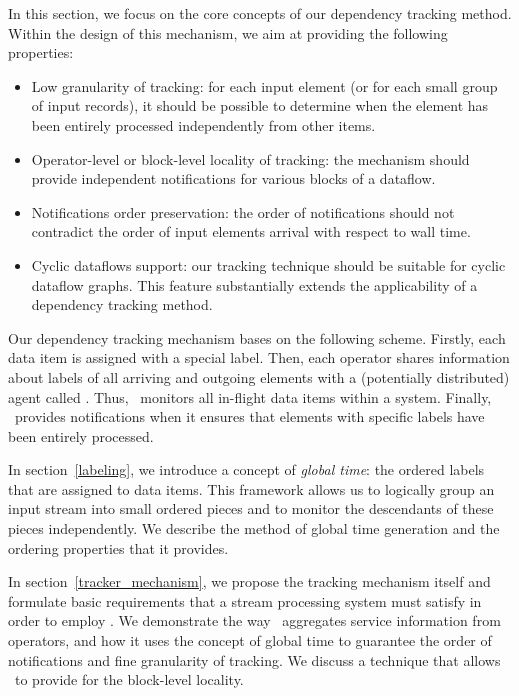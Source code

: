 \label{fs-acker-design}

In this section, we focus on the core concepts of our dependency tracking method. Within the design of this mechanism, we aim at providing the following properties:
\begin{itemize}
    \item Low granularity of tracking: for each input element (or for each small group of input records), it should be possible to determine when the element has been entirely processed independently from other items.
    \item Operator-level or block-level locality of tracking: the mechanism should provide independent notifications for various blocks of a dataflow.
    \item Notifications order preservation: the order of notifications should not contradict the order of input elements arrival with respect to wall time.
    \item Cyclic dataflows support: our tracking technique should be suitable for cyclic dataflow graphs. This feature substantially extends the applicability of a dependency tracking method.
\end{itemize}

Our dependency tracking mechanism bases on the following scheme. Firstly, each data item is assigned with a special label. Then, each operator shares information about labels of all arriving and outgoing elements with a (potentially distributed) agent called {\em \tracker}. Thus, \tracker\ monitors all in-flight data items within a system. Finally, \tracker\ provides notifications when it ensures that elements with specific labels have been entirely processed.

In section~\ref{labeling}, we introduce a concept of {\em global time}: the ordered labels that are assigned to data items. This framework allows us to logically group an input stream into small ordered pieces and to monitor the descendants of these pieces independently. We describe the method of global time generation and the ordering properties that it provides.

In section~\ref{tracker_mechanism}, we propose the tracking mechanism itself and formulate basic requirements that a stream processing system must satisfy in order to employ \tracker . We demonstrate the way \tracker\ aggregates service information from operators, and how it uses the concept of global time to guarantee the order of notifications and fine granularity of tracking. We discuss a technique that allows \tracker\ to provide for the block-level locality. 

